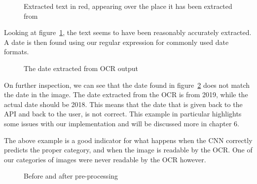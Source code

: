\begin{figure}[h]
    \caption{Extracted text in red, appearing over the place it has been extracted from}
    \label{fig:ocrtextboxes}
\end{figure}
\clearpage
Looking at figure~\ref{fig:ocrtextboxes}, the text seems to have been reasonably accurately extracted.
A date is then found using our regular expression for commonly used date formats.

\begin{figure}[h]
    \caption{The date extracted from OCR output}
    \label{fig:dateocr}
\end{figure}

On further inspection, we can see that the date found in figure{~\ref{fig:dateocr}} does not match the date in
the image.
The date extracted from the OCR is from 2019, while the actual date should be 2018.
This means that the date that is given back to the API and back to the user, is not correct.
This example in particular highlights some issues with our implementation and will be discussed more in chapter 6.

The above example is a good indicator for what happens when the CNN correctly predicts the proper category, and when the image is readable by the OCR\@.
One of our categories of images were never readable by the OCR however.

\begin{figure}[h]
    \caption{Before and after pre-processing}
    \label{fig:beforeafterflybuss}
\end{figure}

